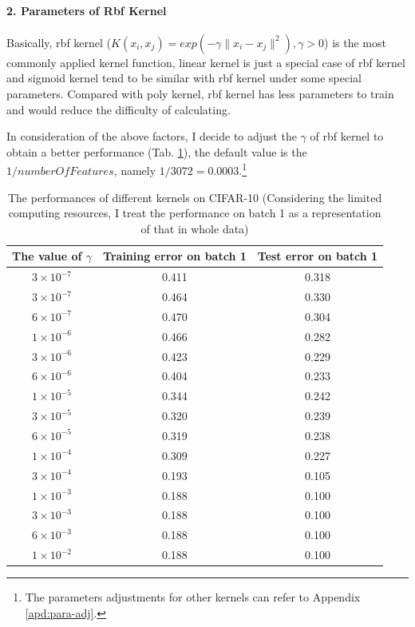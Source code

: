 \documentclass[12pt,a4paper]{article}
\theoremstyle{definition}
\begin{document}
\paragraph{2. Parameters of Rbf Kernel}

Basically, rbf kernel ($K(x_i, x_j)=exp(-\gamma\|x_i-x_j\|^2), \gamma>0$) is the most commonly applied kernel function, linear kernel is just a special case of rbf kernel and sigmoid kernel tend to be similar with rbf kernel under some special parameters. Compared with poly kernel, rbf kernel has less parameters to train and would reduce the difficulty of calculating.

\vspace{0.015\linewidth}
In consideration of the above factors, I decide to adjust the $\gamma$ of rbf kernel to obtain a better performance (Tab. \ref{tab:rbf-para}), the default value is the $1/numberOfFeatures$, namely $1/3072=0.0003$.\footnote{The parameters adjustments for other kernels can refer to Appendix \ref{apd:para-adj}.}

\begin{table}[H]
	\renewcommand\arraystretch{1.35}
	\caption{The performances of different kernels on CIFAR-10 (Considering the limited computing resources, I treat the performance on batch 1 as a representation of that in whole data)}
	\label{tab:rbf-para}
	\centering
	
	\begin{tabular}{c|c|c}
		\centering
		The value of $\gamma$ & Training error on batch 1 & Test error on batch 1 \\
		\hline
		\hline
		
		$3 \times 10^{-7}$ & 0.411 & 0.318 \\
		$3 \times 10^{-7}$ & 0.464 & 0.330 \\
		$6 \times 10^{-7}$ & 0.470 & 0.304 \\
		$1 \times 10^{-6}$ & 0.466 & 0.282 \\
		$3 \times 10^{-6}$ & 0.423 & 0.229 \\
		$6 \times 10^{-6}$ & 0.404 & 0.233 \\
		$1 \times 10^{-5}$ & 0.344 & 0.242 \\
		$3 \times 10^{-5}$ & 0.320 & 0.239 \\
		$6 \times 10^{-5}$ & 0.319 & 0.238 \\
		$1 \times 10^{-4}$ & 0.309 & 0.227 \\
		$3 \times 10^{-4}$ & 0.193 & 0.105 \\
		$1 \times 10^{-3}$ & 0.188 & 0.100 \\
		$3 \times 10^{-3}$ & 0.188 & 0.100 \\
		$6 \times 10^{-3}$ & 0.188 & 0.100 \\
		$1 \times 10^{-2}$ & 0.188 & 0.100 \\
	\end{tabular}
\end{table}
\end{document}
